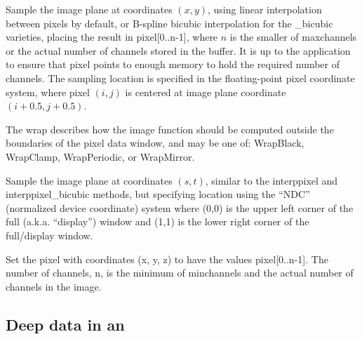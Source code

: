 Sample the image plane at coordinates $(x,y)$,
using linear interpolation between pixels by default, or B-spline
bicubic interpolation for the {\cf _bicubic} varieties, placing the result in
{\cf pixel[0..n-1]}, where $n$ is the smaller of {\cf maxchannels}
or the actual number of channels stored in the buffer.  It is up to
the application to ensure that {\cf pixel} points to enough memory
to hold the required number of channels.
The sampling location is specified in the floating-point pixel coordinate
system, where pixel $(i,j)$ is centered at image plane coordinate $(i+0.5,
j+0.5)$.

The {\cf wrap} describes how the image function should be computed
outside the boundaries of the pixel data window, and may be one of:
{\cf WrapBlack}, {\cf WrapClamp}, {\cf WrapPeriodic}, or {\cf WrapMirror}.
\apiend

Sample the image plane at coordinates $(s,t)$, similar to the
{\cf\small interppixel} and {\cf\small interppixel_bicubic} methods, but
specifying location using the ``NDC'' (normalized
device coordinate) system where (0,0) is the upper left corner of the full
(a.k.a. ``display'') window and (1,1) is the lower right corner of the
full/display window.
\apiend

Set the pixel with coordinates {\cf (x, y, z)} to have the values
{\cf pixel[0..n-1]}.  The number of channels, {\cf n}, is the minimum of
{\cf minchannels} and the actual number of channels in the image.
\apiend


\subsection*{Deep data in an \ImageBuf}

